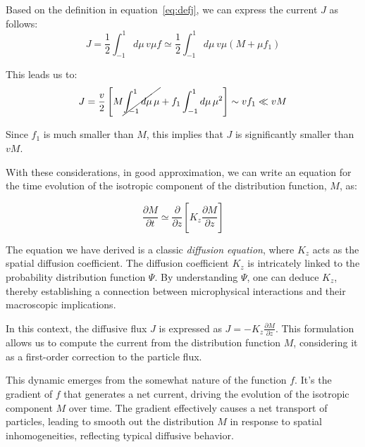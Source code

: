 Based on the definition in equation~\eqref{eq:defj}, we can express the current \( J \) as follows:
%
\begin{equation}
J = \frac{1}{2} \int_{-1}^1 d\mu \, v\mu f \simeq \frac{1}{2} \int_{-1}^1 d\mu \, v\mu (M + \mu f_1) 
\end{equation}

This leads us to:
%
\begin{equation}
J = \frac{v}{2} \left[ M \cancel{\int_{-1}^1 d\mu \, \mu} + f_1 \int_{-1}^1 d\mu \, \mu^2 \right] \sim v f_1 \ll v M
\end{equation}

Since \( f_1 \) is much smaller than \( M \), this implies that \( J \) is significantly smaller than \( vM \).


With these considerations, in good approximation, we can write an equation for the time evolution of the isotropic component of the distribution function, \( M \), as:
%
\begin{remark}
\begin{equation}
\frac{\partial M}{\partial t} \simeq \frac{\partial}{\partial z}\left[K_z \frac{\partial M}{\partial z}  \right]
\end{equation}
\end{remark}

The equation we have derived is a classic \emph{diffusion equation}, where \( K_z \) acts as the spatial diffusion coefficient. The diffusion coefficient \( K_z \) is intricately linked to the probability distribution function \( \Psi \). By understanding \( \Psi \), one can deduce \( K_z \), thereby establishing a connection between microphysical interactions and their macroscopic implications.

In this context, the diffusive flux \( J \) is expressed as \( J = -K_z \frac{\partial M}{\partial z} \). This formulation allows us to compute the current from the distribution function \( M \), considering it as a first-order correction to the particle flux. 

This dynamic emerges from the somewhat nature of the function \( f \). It's the gradient of \( f \) that generates a net current, driving the evolution of the isotropic component \( M \) over time. The gradient effectively causes a net transport of particles, leading to smooth out the distribution \( M \) in response to spatial inhomogeneities, reflecting typical diffusive behavior. 

